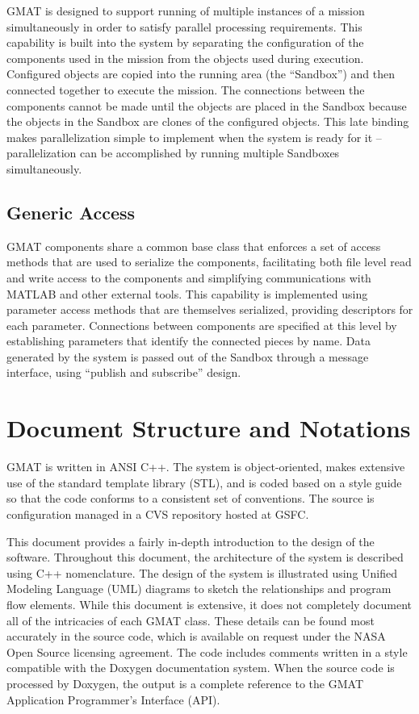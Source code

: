 GMAT is designed to support running of multiple instances of a mission simultaneously in order to
satisfy parallel processing requirements.  This capability is built into the system by separating
the configuration of the components used in the mission from the objects used during execution.
Configured objects are copied into the running area (the ``Sandbox'') and then connected together to
execute the mission.  The connections between the components cannot be made until the objects are
placed in the Sandbox because the objects in the Sandbox are clones of the configured objects.  This
late binding makes parallelization simple to implement when the system is ready for it --
parallelization can be accomplished by running multiple Sandboxes simultaneously.

\subsection{Generic Access}

GMAT components share a common base class that enforces a set of access methods that are used to
serialize the components, facilitating both file level read and write access to the components and
simplifying communications with MATLAB and other external tools.  This capability is implemented
using parameter access methods that are themselves serialized, providing descriptors for each
parameter.  Connections between components are specified at this level by establishing parameters
that identify the connected pieces by name.  Data generated by the system is passed out of the
Sandbox through a message interface, using ``publish and subscribe'' design.

\section{Document Structure and Notations}

GMAT is written in ANSI C++.  The system is object-oriented, makes extensive use of the standard
template library (STL), and is coded based on a style guide\cite{shoan} so that the code conforms to
a consistent set of conventions.  The source is configuration managed in a CVS repository hosted at
GSFC.

This document provides a fairly in-depth introduction to the design of the software.  Throughout
this document, the architecture of the system is described using C++ nomenclature.  The design of
the system is illustrated using Unified Modeling Language (UML) diagrams to sketch the relationships
and program flow elements.  While this document is extensive, it does not completely document all
of the intricacies of each GMAT class.  These details can be found most accurately in the source
code, which is available on request under the NASA Open Source licensing agreement.  The code
includes comments written in a style compatible with the Doxygen documentation system.  When the
source code is processed by Doxygen, the output is a complete reference to the GMAT Application
Programmer's Interface (API).
